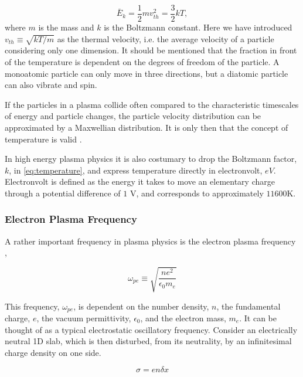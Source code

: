		\begin{equation}
			\bar{E}_k = \frac{1}{2} m v_{th}^2 = \frac{3}{2} kT, \label{eq:temperature}
		\end{equation}
		where \(m\) is the mass and \(k\) is the Boltzmann constant.
		Here we have introduced \(v_{th} \equiv  \sqrt{kT/m}\) as the thermal velocity, i.e.
		the average velocity of a particle considering only one dimension. It should be mentioned that the fraction in
		front of the temperature is dependent on the degrees of freedom of the particle.
		A monoatomic particle can only move in three directions, but a diatomic particle
		can also vibrate and spin.

		If the particles in a plasma collide often compared to the characteristic timescales
		of energy and particle changes, the particle velocity distribution can be approximated
		by a Maxwellian distribution. It is only then that the concept of
		temperature is valid \citep{goldston_introduction_1995}.

		In high energy plasma physics it is also costumary to drop the Boltzmann factor, \(k\),
		in \cref{eq:temperature}, and express temperature directly in electronvolt, \(eV\).
		Electronvolt is defined as the energy it takes to move an elementary charge through
		a potential difference of \(1\) \si{\volt}, and corresponds to approximately
		\(11600 \si{\kelvin}\).

		\subsubsection{Electron Plasma Frequency}
		\label{sec:frequency}
		A rather important frequency in plasma physics is the electron plasma frequency \citep{chen_introduction_1984},

		\begin{equation}
			\omega_{pe} \equiv \sqrt{\frac{ne^2}{\epsilon_0 m_e}}
		\end{equation}

		This frequency, \(\omega_{pe}\), is dependent on the number density, \(n\),
		the fundamental charge, \(e\), the vacuum permittivity, \(\epsilon_0\), and
		the electron mass, \(m_e\).
		It can be thought of as a typical electrostatic oscillatory frequency.
		Consider an electrically neutral 1D slab, which is then disturbed, from its
		neutrality, by an infinitesimal charge density on one side.

		\begin{equation}
			\sigma = en\delta x
		\end{equation}

